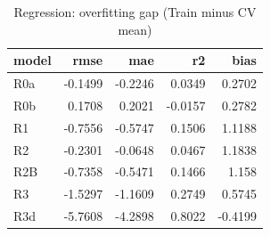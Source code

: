 \begin{table}[htbp]
\centering
\small
\caption{Regression: overfitting gap (Train minus CV mean)}
\begin{tabular}{lrrrr}
\toprule
model & rmse & mae & r2 & bias \\
\midrule
R0a & -0.1499 & -0.2246 & 0.0349 & 0.2702 \\
R0b & 0.1708 & 0.2021 & -0.0157 & 0.2782 \\
R1 & -0.7556 & -0.5747 & 0.1506 & 1.1188 \\
R2 & -0.2301 & -0.0648 & 0.0467 & 1.1838 \\
R2B & -0.7358 & -0.5471 & 0.1466 & 1.158 \\
R3 & -1.5297 & -1.1609 & 0.2749 & 0.5745 \\
R3d & -5.7608 & -4.2898 & 0.8022 & -0.4199 \\
\bottomrule
\end{tabular}
\par\smallskip\begin{minipage}{\linewidth}\footnotesize \end{minipage}
\end{table}


